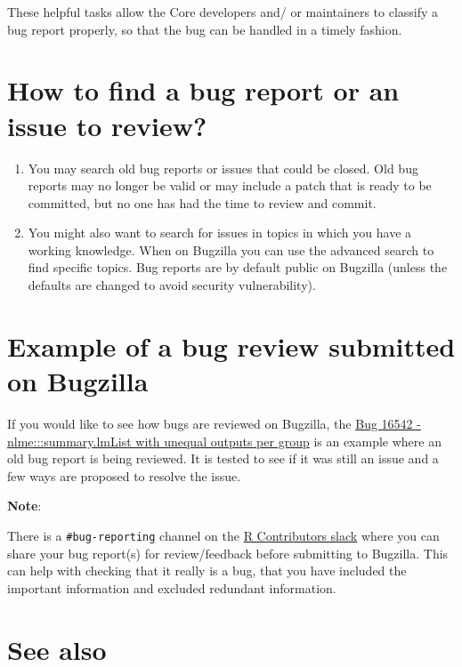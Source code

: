 \documentclass[
]{book}
\begin{document}
These helpful tasks allow the Core developers and/ or maintainers to classify a bug report properly, so that the bug can be handled in a timely fashion.

\section{How to find a bug report or an issue to review?}\label{how-to-find-a-bug-report-or-an-issue-to-review}

\begin{enumerate}
\def\labelenumi{\arabic{enumi}.}
\item
  You may search old bug reports or issues that could be closed. Old bug reports may no longer be valid or may include a patch that is ready to be committed, but no one has had the time to review and commit.
\item
  You might also want to search for issues in topics in which you have a working knowledge. When on Bugzilla you can use the advanced search to find specific topics. Bug reports are by default public on Bugzilla (unless the defaults are changed to avoid security vulnerability).
\end{enumerate}

\section{Example of a bug review submitted on Bugzilla}\label{example-of-a-bug-review-submitted-on-bugzilla}

If you would like to see how bugs are reviewed on Bugzilla, the \href{https://bugs.r-project.org/bugzilla/show_bug.cgi?id=16542}{Bug 16542 - nlme:::summary.lmList with unequal outputs per group} is an example where an old bug report is being reviewed. It is tested to see if it was still an issue and a few ways are proposed to resolve the issue.

\textbf{Note}:

There is a \texttt{\#bug-reporting} channel on the \href{https://r-contributors.slack.com/}{R Contributors slack} where you can share your bug report(s) for review/feedback before submitting to Bugzilla. This can help with checking that it really is a bug, that you have included the important information and excluded redundant information.

\section{See also}\label{see-also-2}
\end{document}
